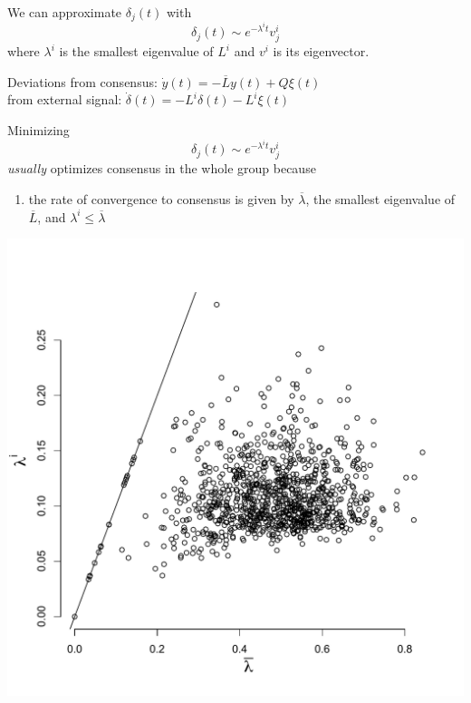 \documentclass{beamer}
\begin{document}
\begin{frame}

We can approximate $\delta_j(t)$ with $$\delta_j(t)\sim e^{-\lambda^it}v_j^i$$ where $\lambda^i$ is the smallest eigenvalue of $L^i$ and $v^i$ is its eigenvector.

\end{frame}

\begin{frame}
\begin{block}{{\small Deviations}}{
{\small from consensus: $\dot{y}(t)=-\overline{L}y(t)+Q\xi(t) $}
\\{\small from external signal: $\dot{\delta}(t)=-L^i\delta(t)-L^i\xi(t)$}
}\end{block}
Minimizing 
$$\delta_j(t)\sim e^{-\lambda^it}v_j^i$$
\textcolor{lightMyColor}{\emph{usually}} optimizes consensus in the whole group because 
\begin{enumerate}
\item the rate of convergence to consensus is given by $\overline{\lambda}$, the smallest eigenvalue of $\overline{L}$, and $\lambda^i\leq\overline{\lambda}$
\end{enumerate}
\end{frame}

\begin{frame}
\begin{center}
\includegraphics[width=.8\textwidth]{eigenvalue_comparison}
\end{center}
\end{frame}
\end{document}
